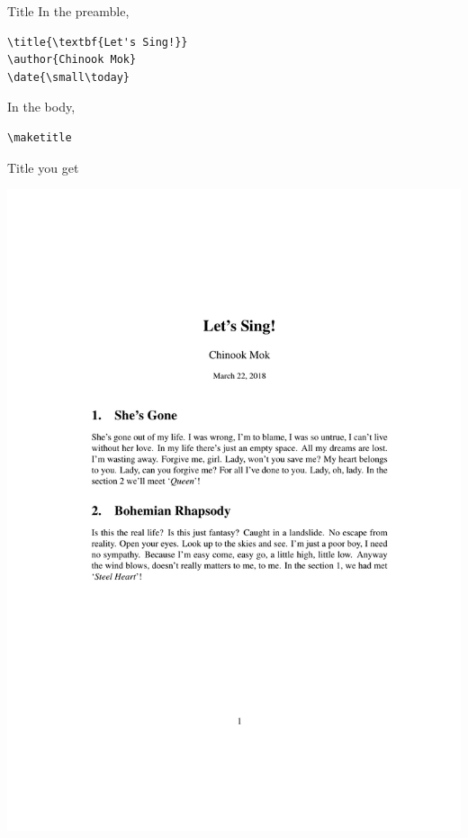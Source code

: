 \documentclass[12pt]{gshs_lecture}
\begin{document}
\begin{frame}[t,fragile]{Title}\small
In the preamble,
\begin{block}{}
\begin{lstlisting}
\title{\textbf{Let's Sing!}}
\author{Chinook Mok}
\date{\small\today}
\end{lstlisting}
\end{block}
In the body,
\begin{block}{}
\begin{lstlisting}
\maketitle
\end{lstlisting}
\end{block}
\end{frame}

\begin{frame}[t]{Title}\small
you get
\begin{center}
\begin{framed}
\includegraphics[width=\textwidth,trim={0cm 13cm 0cm 4cm},clip]{./test_article/article007.pdf}
\end{framed}
\end{center}
\end{frame}
\end{document}
